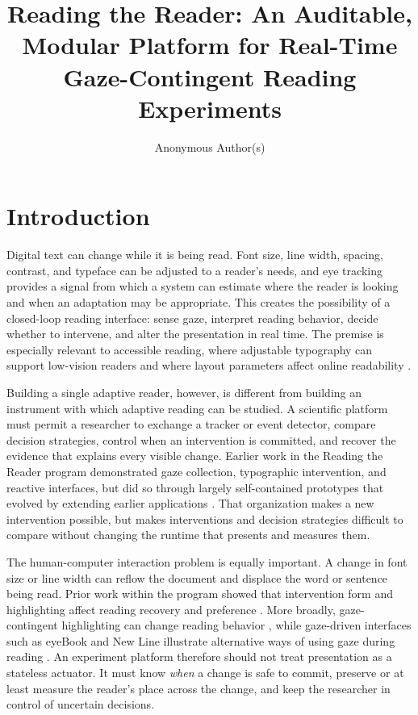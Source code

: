 \documentclass[sigconf,review,anonymous]{acmart}
\title{Reading the Reader: An Auditable, Modular Platform for Real-Time Gaze-Contingent Reading Experiments}
\author{Anonymous Author(s)}
\begin{document}
\maketitle

\section{Introduction}

Digital text can change while it is being read.
Font size, line width, spacing, contrast, and typeface can be adjusted to a reader's needs, and eye tracking provides a signal from which a system can estimate where the reader is looking and when an adaptation may be appropriate.
This creates the possibility of a closed-loop reading interface: sense gaze, interpret reading behavior, decide whether to intervene, and alter the presentation in real time.
The premise is especially relevant to accessible reading, where adjustable typography can support low-vision readers and where layout parameters affect online readability \cite{arditi2004adjustable,beier2021letterspacing,rello2016makeitbig}.

Building a single adaptive reader, however, is different from building an instrument with which adaptive reading can be studied.
A scientific platform must permit a researcher to exchange a tracker or event detector, compare decision strategies, control when an intervention is committed, and recover the evidence that explains every visible change.
Earlier work in the Reading the Reader program demonstrated gaze collection, typographic intervention, and reactive interfaces, but did so through largely self-contained prototypes that evolved by extending earlier applications \cite{refsgaard2024rtr,pereira2024typography,palinec2024reactive}.
That organization makes a new intervention possible, but makes interventions and decision strategies difficult to compare without changing the runtime that presents and measures them.

The human-computer interaction problem is equally important.
A change in font size or line width can reflow the document and displace the word or sentence being read.
Prior work within the program showed that intervention form and highlighting affect reading recovery and preference \cite{jensen2025context}.
More broadly, gaze-contingent highlighting can change reading behavior \cite{rummens2025highlighting}, while gaze-driven interfaces such as eyeBook and New Line illustrate alternative ways of using gaze during reading \cite{biedert2010eyebook,medan2024newline}.
An experiment platform therefore should not treat presentation as a stateless actuator.
It must know \emph{when} a change is safe to commit, preserve or at least measure the reader's place across the change, and keep the researcher in control of uncertain decisions.
\end{document}
